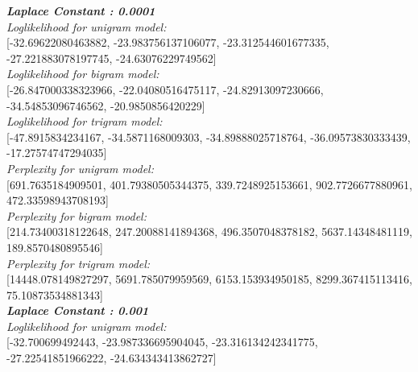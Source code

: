 \documentclass[11ppt]{article}
\begin{document}
\textit{\textbf{Laplace Constant : 0.0001 }}\\ \vspace{2mm}
\textit{Loglikelihood for unigram model:} \\ \vspace{1mm}  [-32.69622080463882, -23.983756137106077, -23.312544601677335, -27.221883078197745, -24.63076229749562]  \\ \vspace{2mm}
\textit{Loglikelihood for bigram model:} \\ \vspace{1mm}  [-26.847000338323966, -22.04080516475117, -24.82913097230666, -34.54853096746562, -20.9850856420229]  \\ \vspace{2mm}
\textit{Loglikelihood for trigram model:} \\ \vspace{1mm}  [-47.8915834234167, -34.5871168009303, -34.89888025718764, -36.09573830333439, -17.27574747294035]  \\ \vspace{2mm}
\textit{Perplexity for unigram model:} \\ \vspace{1mm}  [691.7635184909501, 401.79380505344375, 339.7248925153661, 902.7726677880961, 472.33598943708193]  \\ \vspace{2mm}
\textit{Perplexity for bigram model:} \\ \vspace{1mm}  [214.73400318122648, 247.20088141894368, 496.3507048378182, 5637.14348481119, 189.8570480895546]  \\ \vspace{2mm}
\textit{Perplexity for trigram model:} \\ \vspace{1mm}  [14448.078149827297, 5691.785079959569, 6153.153934950185, 8299.367415113416, 75.10873534881343]  \\ \vspace{2mm}
\textit{\textbf{Laplace Constant : 0.001 }}\\ \vspace{2mm}
\textit{Loglikelihood for unigram model:} \\ \vspace{1mm}  [-32.700699492443, -23.987336695904045, -23.316134242341775, -27.22541851966222, -24.634343413862727]  \\ \vspace{2mm}
\end{document}
